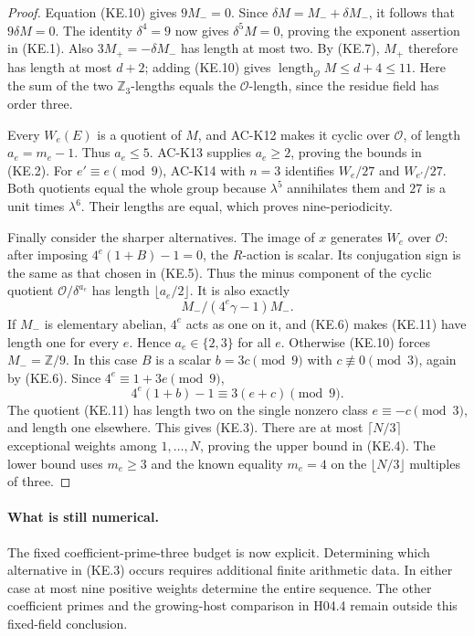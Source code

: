 \begin{proof}
Equation (KE.10) gives $9M_-=0$.
Since $\delta M=M_-+\delta M_-$, it follows that
$9\delta M=0$.  The identity $\delta^4=9$ now gives
$\delta^5M=0$, proving the exponent assertion in (KE.1).
Also $3M_+=-\delta M_-$ has length at most two.
By (KE.7), $M_+$ therefore has length at most $d+2$;
adding (KE.10) gives
$\operatorname{length}_{\mathcal O}M\leq d+4\leq11$.
Here the sum of the two $\mathbb Z_3$-lengths equals the
$\mathcal O$-length, since the residue field has order three.

Every $W_e(E)$ is a quotient of $M$, and AC-K12 makes it
cyclic over $\mathcal O$, of length $a_e=m_e-1$.
Thus $a_e\leq5$.  AC-K13 supplies $a_e\geq2$,
proving the bounds in (KE.2).
For $e'\equiv e\pmod9$, AC-K14 with $n=3$ identifies
$W_e/27$ and $W_{e'}/27$.  Both quotients equal the whole
group because $\lambda^5$ annihilates them and
$27$ is a unit times $\lambda^6$.  Their lengths are equal,
which proves nine-periodicity.

Finally consider the sharper alternatives.  The image of
$x$ generates $W_e$ over $\mathcal O$: after imposing
$4^e(1+B)-1=0$, the $R$-action is scalar.
Its conjugation sign is the same as that chosen in (KE.5).
Thus the minus component of the cyclic quotient
$\mathcal O/\delta^{a_e}$ has length
$\lfloor a_e/2\rfloor$.  It is also exactly
\[
                M_-/(4^e\gamma-1)M_- .              \tag{KE.11}
\]
If $M_-$ is elementary abelian, $4^e$ acts as one on it,
and (KE.6) makes (KE.11) have length one for every $e$.
Hence $a_e\in\{2,3\}$ for all $e$.
Otherwise (KE.10) forces $M_-=\mathbb Z/9$.
In this case $B$ is a scalar $b=3c\pmod9$ with
$c\not\equiv0\pmod3$, again by (KE.6).
Since $4^e\equiv1+3e\pmod9$,
\[
             4^e(1+b)-1\equiv3(e+c)\pmod9.
\]
The quotient (KE.11) has length two on the single nonzero
class $e\equiv-c\pmod3$, and length one elsewhere.
This gives (KE.3).
There are at most $\lceil N/3\rceil$ exceptional weights
among $1,\ldots,N$, proving the upper bound in (KE.4).
The lower bound uses $m_e\geq3$ and the known equality
$m_e=4$ on the $\lfloor N/3\rfloor$ multiples of three.
\end{proof}

\paragraph{What is still numerical.}
The fixed coefficient-prime-three budget is now explicit.
Determining which alternative in (KE.3) occurs requires
additional finite arithmetic data.  In either case at most
nine positive weights determine the entire sequence.
The other coefficient primes and the growing-host comparison
in H04.4 remain outside this fixed-field conclusion.
